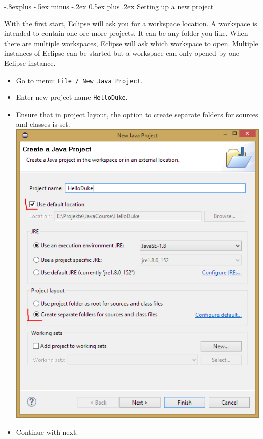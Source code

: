 \documentclass[10pt,landscape,a4paper]{article}
\makeatletter
\renewcommand{\subsection}{\@startsection{subsection}{2}{0mm}%
                                {-.8explus -.5ex minus -.2ex}%
                                {0.5ex plus .2ex}%
                                {\normalfont\normalsize\bfseries}}
\makeatother
\begin{document}
\begin{multicols}{2}
\subsection{Setting up a new project}
\begin{multicols}{2}
With the first start, Eclipse will ask you for a workspace location. A workspace is intended to contain one ore more projects. It can be any folder you like. When there are multiple workspaces, Eclipse will ask which workspace to open. Multiple instances of Eclipse can be started but a workspace can only opened by one Eclipse instance.\\
\begin{itemize}
\item Go to menu: \texttt{File / New Java Project}.
\item Enter new project name \texttt{HelloDuke}.
\item Ensure that in project layout, the option to create separate folders for sources and classes is set. \includegraphics[width=.9\linewidth]{../slides/EclipseProjectWizard1.png}\\
\item Continue with next.

\end{itemize}
\end{multicols}
\end{multicols}
\end{document}
